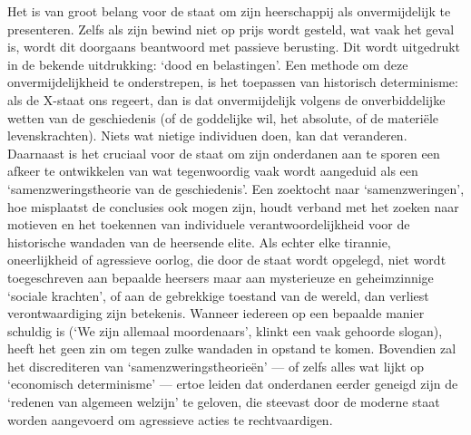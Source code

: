 \documentclass[
  a5paper,
  smalldemyvopaper,10pt,twoside,onecolumn,openright,extrafontsizes,hidelinks]{memoir}
\begin{document}
Het is van groot belang voor de staat om zijn heerschappij als
onvermijdelijk te presenteren. Zelfs als zijn bewind niet op prijs wordt
gesteld, wat vaak het geval is, wordt dit doorgaans beantwoord met
passieve berusting. Dit wordt uitgedrukt in de bekende uitdrukking:
`dood en belastingen'. Een methode om deze onvermijdelijkheid te
onderstrepen, is het toepassen van historisch determinisme: als de
X-staat ons regeert, dan is dat onvermijdelijk volgens de
onverbiddelijke wetten van de geschiedenis (of de goddelijke wil, het
absolute, of de materiële levenskrachten). Niets wat nietige individuen
doen, kan dat veranderen. Daarnaast is het cruciaal voor de staat om
zijn onderdanen aan te sporen een afkeer te ontwikkelen van wat
tegenwoordig vaak wordt aangeduid als een `samenzweringstheorie van de
geschiedenis'. Een zoektocht naar `samenzweringen', hoe misplaatst de
conclusies ook mogen zijn, houdt verband met het zoeken naar motieven en
het toekennen van individuele verantwoordelijkheid voor de historische
wandaden van de heersende elite. Als echter elke tirannie, oneerlijkheid
of agressieve oorlog, die door de staat wordt opgelegd, niet wordt
toegeschreven aan bepaalde heersers maar aan mysterieuze en
geheimzinnige `sociale krachten', of aan de gebrekkige toestand van de
wereld, dan verliest verontwaardiging zijn betekenis. Wanneer iedereen
op een bepaalde manier schuldig is (`We zijn allemaal moordenaars',
klinkt een vaak gehoorde slogan), heeft het geen zin om tegen zulke
wandaden in opstand te komen. Bovendien zal het discrediteren van
`samenzweringstheorieën' --- of zelfs alles wat lijkt op `economisch
determinisme' --- ertoe leiden dat onderdanen eerder geneigd zijn de
`redenen van algemeen welzijn' te geloven, die steevast door de moderne
staat worden aangevoerd om agressieve acties te rechtvaardigen.
\end{document}
